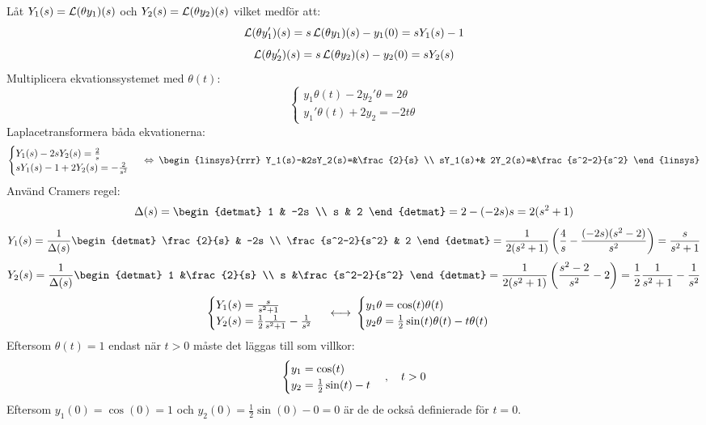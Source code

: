 \pagebreak
\begin{task}{5.4}
	Låt $Y_1(s)=\operatorname{\mathcal{L}}(\theta y_1)(s)$ och $Y_2(s)=\operatorname{\mathcal{L}}(\theta y_2)(s)$ vilket medför att:
	\[\operatorname{\mathcal{L}}(\theta y_1')(s)=s\operatorname{\mathcal{L}}(\theta y_1)(s)-y_1(0)=sY_1(s)-1\]
	\[\operatorname{\mathcal{L}}(\theta y_2')(s)=s\operatorname{\mathcal{L}}(\theta y_2)(s)-y_2(0)=sY_2(s)\]
	Multiplicera ekvationssystemet med $\theta(t)$:
	\[
	\begin{cases}
	y_1\theta(t)-2y_2'\theta=2\theta \\
	y_1'\theta(t)+2y_2=-2t\theta
	\end{cases}\]
	Laplacetransformera båda ekvationerna:
	\[
	\begin{cases}
	Y_1(s)-2sY_2(s)=\frac{2}{s} \\
	sY_1(s)-1+2Y_2(s)=-\frac{2}{s^2}
	\end{cases} \lra
	\begin{linsys}{rrr}
	 Y_1(s)-&2sY_2(s)=&\frac{2}{s} \\
	sY_1(s)+& 2Y_2(s)=&\frac{s^2-2}{s^2}
	\end{linsys}\]
	Använd Cramers regel:
	\begin{align*}
	\Delta(s)=\begin{detmat}
	1 & -2s \\
	s & 2
	\end{detmat}=
	2-(-2s)s=2(s^2+1)
	\end{align*}
	\begin{align*}
	Y_1(s)=
	\frac{1}{\Delta(s)}\begin{detmat}
	\frac{2}{s} & -2s \\
	\frac{s^2-2}{s^2} & 2
	\end{detmat}=
	\frac{1}{2(s^2+1)}\left(\frac{4}{s}-\frac{(-2s)(s^2-2)}{s^2}\right)=
	\frac{s}{s^2+1}
	\end{align*}
	\begin{align*}
	Y_2(s)=
	\frac{1}{\Delta(s)}\begin{detmat}
	1 &\frac{2}{s} \\
	s &\frac{s^2-2}{s^2}
	\end{detmat}=
	\frac{1}{2(s^2+1)}\left(\frac{s^2-2}{s^2}-2\right)=
	\frac{1}{2}\*\frac{1}{s^2+1}-\frac{1}{s^2}
	\end{align*}
	\[\begin{cases}
	Y_1(s)=\frac{s}{s^2+1} \\
	Y_2(s)=\frac{1}{2}\*\frac{1}{s^2+1}-\frac{1}{s^2}
	\end{cases}\llra
	\begin{cases}
	y_1\theta=\cos(t)\theta(t) \\
	y_2\theta=\frac{1}{2}\sin(t)\theta(t)-t\theta(t)
	\end{cases}\]
	Eftersom $\theta(t)=1$ endast när $t>0$ måste det läggas till som villkor:
	\[\begin{cases}
	y_1=\cos(t) \\
	y_2=\frac{1}{2}\sin(t)-t
	\end{cases}, \quad t > 0\]
	Eftersom $y_1(0)=\cos(0)=1$ och $y_2(0)=\frac{1}{2}\sin(0)-0=0$ är de de också definierade för $t=0$.
	

\end{task}
